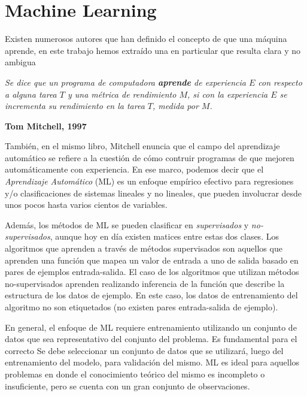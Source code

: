 


\justifying

\section{Machine Learning}

  \par Existen numerosos autores que han definido el concepto de que una máquina
    aprende, en este trabajo hemos extraído una en particular que resulta
    clara y no ambigua
    \begin{framed}
      \begin{center}
        \textit{Se dice que un programa de computadora \textbf{aprende} de experiencia
        $E$ con respecto a alguna tarea $T$ y una métrica de rendimiento $M$, si
        con la experiencia $E$ se incrementa su rendimiento en la tarea $T$,
        medida por $M$.}\\
      \end{center}
      \centering \textbf{Tom Mitchell, 1997} \cite{mitchell_learn}
    \end{framed}

    También, en el mismo libro, Mitchell enuncia que el campo del aprendizaje
    automático se refiere a la cuestión de cómo contruir programas de
    que mejoren automáticamente con experiencia.
    En ese marco, podemos decir que el \textit{Aprendizaje Automático} (ML) es un
    enfoque empírico efectivo para regresiones y/o clasificaciones de sistemas
    lineales y no lineales, que pueden involucrar desde unos pocos hasta varios
    cientos de variables.

  \par Además, los métodos de ML se pueden clasificar en
    \textit{supervisados}\cite{supervised_learning} y
    \textit{no-supervisados}\cite{unsupervised_learning}, aunque hoy en día
    existen matices entre estas dos clases\cite{semi_supervised}.
    Los algoritmos que aprenden a través de métodos supervisados son aquellos que
    aprenden una función que mapea un valor de entrada a uno de salida basado
    en pares de ejemplos entrada-salida.
    El caso de los algoritmos que utilizan métodos no-supervisados aprenden
    realizando inferencia de la función que describe la estructura de los datos
    de ejemplo. En este caso, los datos de entrenamiento del algoritmo no son
    etiquetados (no existen pares entrada-salida de ejemplo).

  \par En general, el enfoque de ML requiere entrenamiento utilizando un
    conjunto de datos que sea representativo del conjunto del problema.
    Es fundamental para el correcto
    Se debe seleccionar un conjunto de datos que se utilizará,
    luego del entrenamiento del modelo, para validación del mismo\cite{test_val}.
    ML es ideal para aquellos problemas en donde el conocimiento teórico del mismo
    es incompleto o insuficiente, pero se cuenta con un gran conjunto de observaciones.


